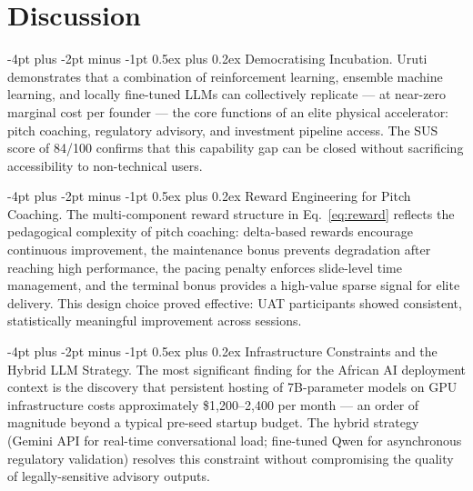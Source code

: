 \documentclass{article}
\makeatletter
\renewcommand\paragraph{\@startsection{paragraph}{4}{\z@}%
  {-4pt plus -2pt minus -1pt}%
  {0.5ex plus 0.2ex}%
  {\normalsize\bf}}
\makeatother
\begin{document}

\FloatBarrier
\section{Discussion}

\paragraph{Democratising Incubation.}
Uruti demonstrates that a combination of reinforcement learning, ensemble
machine learning, and locally fine-tuned LLMs can collectively replicate --- at
near-zero marginal cost per founder --- the core functions of an elite physical
accelerator: pitch coaching, regulatory advisory, and investment pipeline access.
The SUS score of 84/100 confirms that this capability gap can be closed without
sacrificing accessibility to non-technical users.

\paragraph{Reward Engineering for Pitch Coaching.}
The multi-component reward structure in Eq.~\eqref{eq:reward} reflects the
pedagogical complexity of pitch coaching: delta-based rewards encourage
continuous improvement, the maintenance bonus prevents degradation after
reaching high performance, the pacing penalty enforces slide-level time
management, and the terminal bonus provides a high-value sparse signal for
elite delivery. This design choice proved effective: UAT participants
showed consistent, statistically meaningful improvement across sessions.

\paragraph{Infrastructure Constraints and the Hybrid LLM Strategy.}
The most significant finding for the African AI deployment context is the
discovery that persistent hosting of 7B-parameter models on GPU infrastructure
costs approximately \$1{,}200--2{,}400 per month --- an order of magnitude
beyond a typical pre-seed startup budget. The hybrid strategy (Gemini API for
real-time conversational load; fine-tuned Qwen for asynchronous regulatory
validation) resolves this constraint without compromising the quality of
legally-sensitive advisory outputs.
\end{document}
